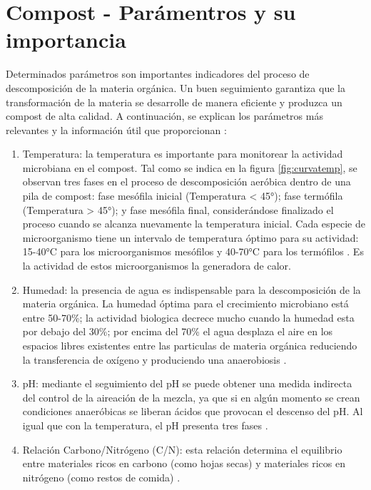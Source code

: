 \section{Compost - Parámentros y su importancia}
\label{sec:CompostParámentros}

Determinados parámetros son importantes indicadores del proceso de descomposición de la materia orgánica. Un buen seguimiento garantiza que la transformación de la materia se desarrolle de manera eficiente y produzca un compost de alta calidad.
A continuación, se explican los parámetros más relevantes y la información útil que proporcionan \citep{ManualBuenasPracticas}:

 \begin{enumerate}
	\item Temperatura: la temperatura es importante para monitorear la actividad microbiana en el compost. Tal como se indica en la figura \ref{fig:curvatemp}, se observan tres fases en el proceso de descomposición aeróbica dentro de una pila de compost: fase mesófila inicial (Temperatura < 45°); fase termófila (Temperatura > 45°); y fase mesófila final, considerándose finalizado el proceso cuando se alcanza nuevamente la temperatura inicial.
    Cada especie de microorganismo tiene un intervalo de temperatura óptimo para su actividad: 15-40°C para los microorganismos mesófilos y 40-70°C para los termófilos \citep{FactoresCompost}. Es la actividad de estos microorganismos la generadora de calor.
    \item Humedad: la presencia de agua es indispensable para la descomposición de la materia orgánica. La humedad óptima para el crecimiento microbiano está entre 50-70\%; la actividad biologica decrece mucho cuando la humedad esta por debajo del 30\%; por encima del 70\% el agua desplaza el aire en los espacios libres existentes entre las particulas de materia orgánica reduciendo la transferencia de oxígeno y produciendo una anaerobiosis \citep{Compost}.
    \item pH: mediante el seguimiento del pH se puede obtener una medida indirecta del control de la aireación de la mezcla, ya que si en algún momento se crean condiciones anaeróbicas se liberan ácidos que provocan el descenso del pH. Al igual que con la temperatura, el pH presenta tres fases \citep{FactoresCompost}.
    \item Relación Carbono/Nitrógeno (C/N): esta relación determina el equilibrio entre materiales ricos en carbono (como hojas secas) y materiales ricos en nitrógeno (como restos de comida) \citep{FactoresCompost}.

\end{enumerate}
